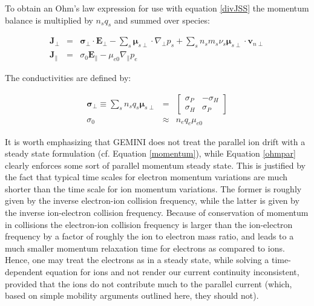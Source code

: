 \documentclass[11pt,letterpaper]{article}
\begin{document}
To obtain an Ohm's law expression for use with equation \ref{divJSS} the momentum balance is multiplied by $n_s q_s$ and summed over species:  
\begin{linenomath*} \begin{eqnarray}
\mathbf{J}_\perp &=& \boldsymbol{\sigma}_\perp \cdot \mathbf{E}_\perp - \sum_s \boldsymbol{\mu}_{s\perp} \cdot \nabla_\perp p_s + \sum_s n_s m_s \nu_s \boldsymbol{\mu}_{s\perp} \cdot \mathbf{v}_{n\perp} \label{ohm} \\
\mathbf{J}_\parallel &=& \sigma_0 \mathbf{E}_\parallel - \mu_{e0} \nabla_\parallel p_e \label{ohmpar}
\end{eqnarray} \end{linenomath*}
The conductivities are defined by:
\begin{linenomath*} \begin{eqnarray}
\boldsymbol{\sigma}_\perp
\equiv
\sum_s n_s q_s \boldsymbol{\mu}_{s\perp}
&=&
\left[ \begin{array}{ccc}
  \sigma_P & -\sigma_H \\
  \sigma_H &  \sigma_P
\end{array} \right] \\
\sigma_0 &\approx& n_e q_e \mu_{e0}
\end{eqnarray} \end{linenomath*}

It is worth emphasizing that GEMINI does not treat the parallel ion drift with a steady state formulation (cf. Equation \ref{momentum}), while Equation \ref{ohmpar} clearly enforces some sort of parallel momentum steady state.  This is justified by the fact that typical time scales for electron momentum variations are much shorter than the time scale for ion momentum variations.  The former is roughly given by the inverse electron-ion collision frequency, while the latter is given by the inverse ion-electron collision frequency. Because of conservation of momentum in collisions \citep[c.f.][]{Schunk:2009} the electron-ion collision frequency is larger than the ion-electron frequency by a factor of roughly the ion to electron mass ratio, and leads to a much smaller momentum relaxation time for electrons as compared to ions.  Hence, one may treat the electrons as in a steady state, while solving a time-dependent equation for ions and not render our current continuity inconsistent, provided that the ions do not contribute much to the parallel current (which, based on simple mobility arguments outlined here, they should not).
\end{document}
